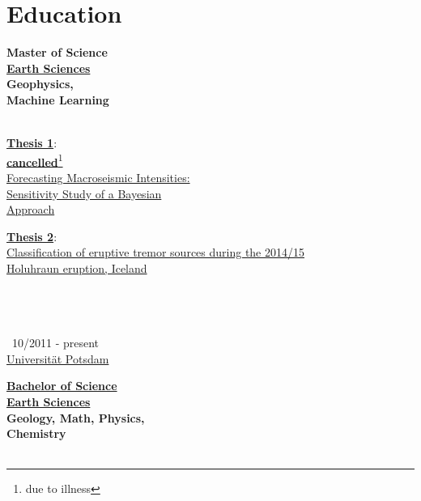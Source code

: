 \documentclass{article}
\begin{document}
\hfill
\vrule
\hfill
\begin{minipage}[t]{0.7\textwidth}
		\section*{\fontsize{18pt}{24pt}\selectfont \color{pblue} Education}
		
		\begin{minipage}[t]{0.38\textwidth}
	\textbf{\large \color{pblue}\faHourglassHalf\hspace{1mm}Master of Science}\\
	\textbf{\underline{Earth Sciences}}\\
	\textbf{Geophysics,\\ Machine Learning}\\\\
	\begin{minipage}[t]{0.52\textwidth}
	\textbf{\underline{Thesis 1}}:\\
	\textbf{\underline{cancelled}}\footnote{due to illness}\\
	\href{https://github.com/silvioschwarz/master-thesis}{Forecasting Macroseismic Intensities:\\Sensitivity Study of a Bayesian\\ Approach}
	\end{minipage}
	\hfill
	\begin{minipage}[t]{0.45\textwidth}
	\textbf{\underline{Thesis 2}}:\\
	\href{https://github.com/silvioschwarz/master-thesis}{Classification of eruptive tremor sources during the 2014/15\\ Holuhraun eruption, Iceland}
	\end{minipage}
	\\\\\\\
		10/2011 - present\\
	\href{https://www.uni-potsdam.de/}{\color{pblue}Universität Potsdam}
		\end{minipage}		
		\hfill
		\begin{minipage}[t]{0.33\textwidth}
	\textbf{\href{https://www.dropbox.com/s/297g1chiby8mrd3/Bachelor-Certificate.pdf?dl=0}{\large \color{pblue}\faGraduationCap\hspace{1mm}Bachelor of Science}}\\
	\textbf{\underline{Earth Sciences}}\\
	\textbf{Geology, Math, Physics,\\ Chemistry}\\\\

\end{minipage}
\end{minipage}
\end{document}
